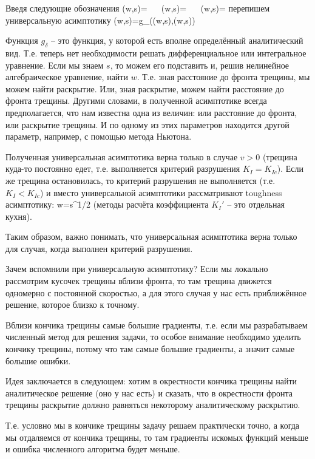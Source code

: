 \documentclass[main.tex]{subfiles}
\begin{document}
Введя следующие обозначения
\beq
{}(w,s)=\,\,\,\,\,\,\,\,\,\,(w,s)=\,\,\,\,\,\,\,\,\,\,(w,s)=
\eeq
перепишем универсальную асимптотику
\beq
{}(w,s)=g_\delta\left((w,s),(w,s)\right)
\eeq


Функция $g_\delta$ -- это функция, у которой есть вполне определённый аналитический вид.
Т.е. теперь нет необходимости решать дифференциальное или интегральное уравнение.
Если мы знаем $s$, то можем его подставить и, решив нелинейное алгебраическое уравнение, найти $w$.
Т.е. зная расстояние до фронта трещины, мы можем найти раскрытие.
Или, зная раскрытие, можем найти расстояние до фронта трещины.
Другими словами, в полученной асимптотике всегда предполагается, что нам известна одна из величин: или расстояние до фронта, или раскрытие трещины.
И по одному из этих параметров находится другой параметр, например, с помощью метода Ньютона.

Полученная универсальная асимптотика верна только в случае $v>0$ (трещина куда-то постоянно едет, т.е. выполняется критерий разрушения $K_{I}=K_{Ic}$).
Если же трещина остановилась, то критерий разрушения не выполняется (т.е. $K_{I}<K_{Ic}$) и вместо универсальной асимптотики рассматривают toughness асимптотику:
\beq
w=s^{1/2}
\eeq
(методы расчёта коэффициента $K_{I}'$ -- это отдельная кухня).

Таким образом, важно понимать, что универсальная асимптотика верна только для случая, когда выполнен критерий разрушения.


Зачем вспомнили при универсальную асимптотику?
Если мы локально рассмотрим кусочек трещины вблизи фронта, то там трещина движется одномерно с постоянной скоростью, а для этого случая у нас есть приближённое решение, которое близко к точному.

Вблизи кончика трещины самые большие градиенты, т.е. если мы разрабатываем численный метод для решения задачи, то особое внимание необходимо уделить кончику трещины, потому что там самые большие градиенты, а значит самые большие ошибки.

Идея заключается в следующем: хотим в окрестности кончика трещины найти аналитическое решение (оно у нас есть) и сказать, что в окрестности фронта трещины раскрытие должно равняться некоторому аналитическому раскрытию.


Т.е. условно мы в кончике трещины задачу решаем практически точно, а когда мы отдаляемся от кончика трещины, то там градиенты искомых функций меньше и ошибка численного алгоритма будет меньше.
\end{document}
